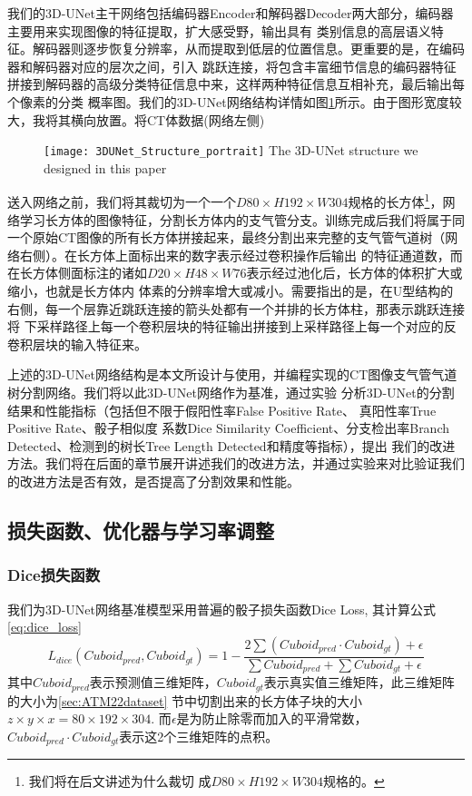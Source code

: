 我们的3D-UNet主干网络包括编码器Encoder和解码器Decoder两大部分，编码器主要用来实现图像的特征提取，扩大感受野，输出具有
类别信息的高层语义特征。解码器则逐步恢复分辨率，从而提取到低层的位置信息。更重要的是，在编码器和解码器对应的层次之间，引入
跳跃连接，将包含丰富细节信息的编码器特征拼接到解码器的高级分类特征信息中来，这样两种特征信息互相补充，最后输出每个像素的分类
概率图。我们的3D-UNet网络结构详情如图\ref{fig:3DUNetStructure}所示。由于图形宽度较大，我将其横向放置。将CT体数据(网络左侧)
\begin{figure}[ht]
    \centering
    \texttt{[image: 3DUNet\_Structure\_portrait]}
        {The 3D-UNet structure we designed in this paper}
    \label{fig:3DUNetStructure}
\end{figure}
送入网络之前，我们将其裁切为一个一个$D80 \times H192 \times W304$规格的长方体\footnote{我们将在后文讲述为什么裁切
成$D80 \times H192 \times W304$规格的。}，网络学习长方体的图像特征，分割长方体内的支气管分支。训练完成后我们将属于同
一个原始CT图像的所有长方体拼接起来，最终分割出来完整的支气管气道树（网络右侧）。在长方体上面标出来的数字表示经过卷积操作后输出
的特征通道数，而在长方体侧面标注的诸如$D20 \times H48 \times W76$表示经过池化后，长方体的体积扩大或缩小，也就是长方体内
体素的分辨率增大或减小。需要指出的是，在U型结构的右侧，每一个层靠近跳跃连接的箭头处都有一个并排的长方体柱，那表示跳跃连接将
下采样路径上每一个卷积层块的特征输出拼接到上采样路径上每一个对应的反卷积层块的输入特征来。

上述的3D-UNet网络结构是本文所设计与使用，并编程实现的CT图像支气管气道树分割网络。我们将以此3D-UNet网络作为基准，通过实验
分析3D-UNet的分割结果和性能指标（包括但不限于假阳性率False Positive Rate、 真阳性率True Positive Rate、骰子相似度
系数Dice Similarity Coefficient、分支检出率Branch Detected、检测到的树长Tree Length Detected和精度等指标），提出
我们的改进方法。我们将在后面的章节展开讲述我们的改进方法，并通过实验来对比验证我们的改进方法是否有效，是否提高了分割效果和性能。

\subsection{损失函数、优化器与学习率调整}
\subsubsection{Dice损失函数}
我们为3D-UNet网络基准模型采用普遍的骰子损失函数Dice Loss, 其计算公式\ref{eq:dice_loss}
\begin{equation}\label{eq:dice_loss}
    L_{dice}\left(Cuboid_{pred}, Cuboid_{gt}\right) = 1 - \frac{2\sum{\left(Cuboid_{pred} \cdot Cuboid_{gt}\right)} + \epsilon}
    {\sum{Cuboid_{pred}} + \sum{Cuboid_{gt}} + \epsilon}
\end{equation}
其中${Cuboid}_{pred}$表示预测值三维矩阵，${Cuboid}_{gt}$表示真实值三维矩阵，此三维矩阵的大小为\ref{sec:ATM22dataset}
节中切割出来的长方体子块的大小$z \times y \times x = 80 \times 192 \times 304$. 而$\epsilon$是为防止除零而加入的平滑常数，
$Cuboid_{pred} \cdot Cuboid_{gt}$表示这2个三维矩阵的点积。

